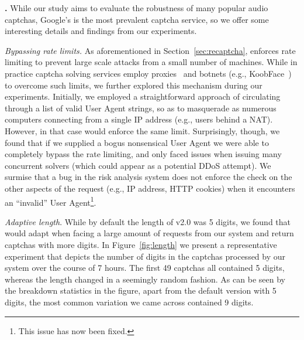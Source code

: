 \textbf{\re.} While our study aims to evaluate the robustness of many popular audio captchas, 
Google's \re is the most prevalent captcha service, so we offer some interesting details 
and findings from our experiments.

\emph{Bypassing rate limits.} As aforementioned in Section~\ref{sec:recaptcha}, \re enforces 
rate limiting to prevent large scale attacks from a small number of machines. While in practice
captcha solving services employ proxies~\cite{captcha_proxies} and botnets (e.g., KoobFace~\cite{captcha_solvers}) 
to overcome such limits, we further explored this mechanism during our experiments. Initially,
we employed a straightforward approach of circulating through a list of valid User Agent strings,
so as to masquerade as numerous computers connecting from a single IP address (e.g., users behind a NAT).
However, in that case \re would enforce the same limit. Surprisingly, though, we found that if we 
supplied a bogus nonsensical User Agent we were able to completely bypass the rate limiting,
and only faced issues when issuing many concurrent solvers (which could appear as a potential DDoS attempt).
We surmise that a bug in the risk analysis
system does not enforce the check on the other aspects of the request (e.g., IP address, HTTP cookies) when
it encounters an ``invalid'' User Agent\footnote{This issue has now been fixed.}.

\emph{Adaptive length}.
While by default the length of \re v2.0 was 5 digits, we found %
that \re would adapt when facing a large amount of requests from our system and return captchas with more digits. 
In Figure~\ref{fig:length} we present a representative experiment that depicts the number of digits in the captchas
processed by our system over the course of 7 hours. The first 49 captchas all contained 5 digits, whereas the length
changed in a seemingly random fashion. As can be seen by the breakdown statistics in the figure, apart from the default
version with 5 digits, the most common variation we came across contained 9 digits.


